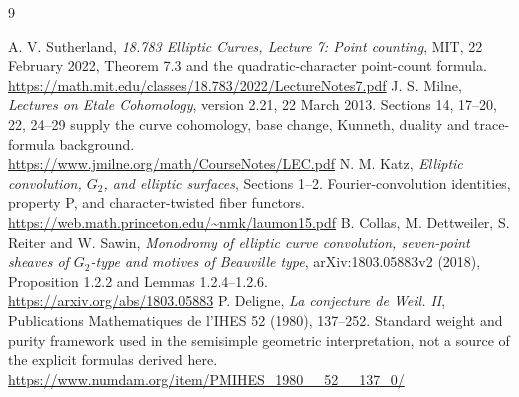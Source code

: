 \documentclass[11pt,a4paper]{article}
\numberwithin{equation}{section}
\begin{document}
\clearpage
\begin{thebibliography}{9}\small

 A. V. Sutherland, \emph{18.783 Elliptic Curves, Lecture 7: Point counting}, MIT, 22 February 2022, Theorem 7.3 and the quadratic-character point-count formula.\\
\url{https://math.mit.edu/classes/18.783/2022/LectureNotes7.pdf}
 J. S. Milne, \emph{Lectures on Etale Cohomology}, version 2.21, 22 March 2013. Sections 14, 17--20, 22, 24--29 supply the curve cohomology, base change, Kunneth, duality and trace-formula background.\\
\url{https://www.jmilne.org/math/CourseNotes/LEC.pdf}
 N. M. Katz, \emph{Elliptic convolution, $G_2$, and elliptic surfaces}, Sections 1--2. Fourier-convolution identities, property P, and character-twisted fiber functors.\\
\url{https://web.math.princeton.edu/~nmk/laumon15.pdf}
 B. Collas, M. Dettweiler, S. Reiter and W. Sawin, \emph{Monodromy of elliptic curve convolution, seven-point sheaves of $G_2$-type and motives of Beauville type}, arXiv:1803.05883v2 (2018), Proposition 1.2.2 and Lemmas 1.2.4--1.2.6.\\
\url{https://arxiv.org/abs/1803.05883}
 P. Deligne, \emph{La conjecture de Weil. II}, Publications Mathematiques de l'IHES 52 (1980), 137--252. Standard weight and purity framework used in the semisimple geometric interpretation, not a source of the explicit formulas derived here.\\
\url{https://www.numdam.org/item/PMIHES_1980__52__137_0/}

\end{thebibliography}
\end{document}
